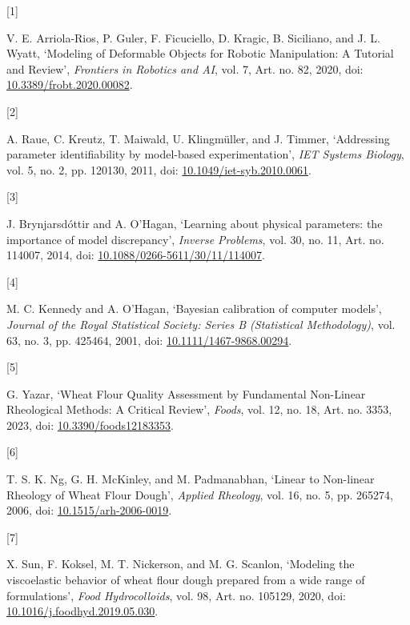 \documentclass[
  11pt,
]{article}
\newlength{\cslhangindent}
\newlength{\csllabelwidth}
\newenvironment{CSLReferences}[2] %
 {\begin{list}{}{%
  \setlength{\itemindent}{0pt}
  \setlength{\leftmargin}{0pt}
  \setlength{\parsep}{0pt}
  \ifodd #1
   \setlength{\leftmargin}{\cslhangindent}
   \setlength{\itemindent}{-1\cslhangindent}
  \fi
  \setlength{\itemsep}{#2\baselineskip}}}
 {\end{list}}
\newcommand{\CSLLeftMargin}[1]{\parbox[t]{\csllabelwidth}{\strut#1\strut}}
\newcommand{\CSLRightInline}[1]{\parbox[t]{\linewidth - \csllabelwidth}{\strut#1\strut}}
\begin{document}
\label{refs}
\begin{CSLReferences}{0}{0}
\CSLLeftMargin{{[}1{]} }%
\CSLRightInline{V. E. Arriola-Rios, P. Guler, F. Ficuciello, D. Kragic,
B. Siciliano, and J. L. Wyatt, {`Modeling of Deformable Objects for
Robotic Manipulation: A Tutorial and Review'}, \emph{Frontiers in
Robotics and AI}, vol. 7, Art. no. 82, 2020, doi:
\href{https://doi.org/10.3389/frobt.2020.00082}{10.3389/frobt.2020.00082}.}

\CSLLeftMargin{{[}2{]} }%
\CSLRightInline{A. Raue, C. Kreutz, T. Maiwald, U. Klingmüller, and J.
Timmer, {`Addressing parameter identifiability by model-based
experimentation'}, \emph{IET Systems Biology}, vol. 5, no. 2, pp.
120\textendash{}\allowbreak{}130, 2011, doi:
\href{https://doi.org/10.1049/iet-syb.2010.0061}{10.1049/iet-syb.2010.0061}.}

\CSLLeftMargin{{[}3{]} }%
\CSLRightInline{J. Brynjarsdóttir and A. O'Hagan, {`Learning about
physical parameters: the importance of model discrepancy'},
\emph{Inverse Problems}, vol. 30, no. 11, Art. no. 114007, 2014, doi:
\href{https://doi.org/10.1088/0266-5611/30/11/114007}{10.1088/0266-5611/30/11/114007}.}

\CSLLeftMargin{{[}4{]} }%
\CSLRightInline{M. C. Kennedy and A. O'Hagan, {`Bayesian calibration of
computer models'}, \emph{Journal of the Royal Statistical Society:
Series B (Statistical Methodology)}, vol. 63, no. 3, pp.
425\textendash{}\allowbreak{}464, 2001, doi:
\href{https://doi.org/10.1111/1467-9868.00294}{10.1111/1467-9868.00294}.}

\CSLLeftMargin{{[}5{]} }%
\CSLRightInline{G. Yazar, {`Wheat Flour Quality Assessment by
Fundamental Non-Linear Rheological Methods: A Critical Review'},
\emph{Foods}, vol. 12, no. 18, Art. no. 3353, 2023, doi:
\href{https://doi.org/10.3390/foods12183353}{10.3390/foods12183353}.}

\CSLLeftMargin{{[}6{]} }%
\CSLRightInline{T. S. K. Ng, G. H. McKinley, and M. Padmanabhan,
{`Linear to Non-linear Rheology of Wheat Flour Dough'}, \emph{Applied
Rheology}, vol. 16, no. 5, pp. 265\textendash{}\allowbreak{}274, 2006,
doi:
\href{https://doi.org/10.1515/arh-2006-0019}{10.1515/arh-2006-0019}.}

\CSLLeftMargin{{[}7{]} }%
\CSLRightInline{X. Sun, F. Koksel, M. T. Nickerson, and M. G. Scanlon,
{`Modeling the viscoelastic behavior of wheat flour dough prepared from
a wide range of formulations'}, \emph{Food Hydrocolloids}, vol. 98, Art.
no. 105129, 2020, doi:
\href{https://doi.org/10.1016/j.foodhyd.2019.05.030}{10.1016/j.foodhyd.2019.05.030}.}


\end{CSLReferences}
\end{document}
